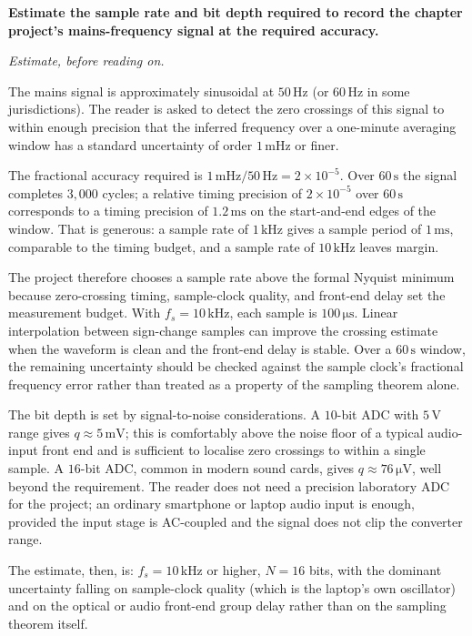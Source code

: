 \begin{estimation}
\textbf{Estimate the sample rate and bit depth required to record
the chapter project's mains-frequency signal at the required
accuracy.}

\smallskip
\textit{Estimate, before reading on.}

\smallskip
The mains signal is approximately sinusoidal at $50 \,\si{\hertz}$
(or $60 \,\si{\hertz}$ in some jurisdictions). The reader is asked
to detect the zero crossings of this signal to within enough
precision that the inferred frequency over a one-minute averaging
window has a standard uncertainty of order $1 \,\si{\milli\hertz}$
or finer.

The fractional accuracy required is $1 \,\si{\milli\hertz} / 50 \,\si
{\hertz} = 2 \times 10^{-5}$. Over $60 \,\si{\second}$ the signal
completes $3{,}000$ cycles; a relative timing precision of $2 \times
10^{-5}$ over $60 \,\si{\second}$ corresponds to a timing precision
of $1.2 \,\si{\milli\second}$ on the start-and-end edges of the
window. That is generous: a sample rate of $1 \,\si{\kilo\hertz}$
gives a sample period of $1 \,\si{\milli\second}$, comparable to the
timing budget, and a sample rate of $10 \,\si{\kilo\hertz}$ leaves
margin.

The project therefore chooses a sample rate above the formal
Nyquist minimum because zero-crossing timing, sample-clock quality,
and front-end delay set the measurement budget. With $f_{s} = 10
\,\si{\kilo\hertz}$, each sample is $100 \,\si{\micro\second}$.
Linear interpolation between sign-change samples can improve the
crossing estimate when the waveform is clean and the front-end
delay is stable. Over a $60 \,\si{\second}$ window, the remaining
uncertainty should be checked against the sample clock's fractional
frequency error rather than treated as a property of the sampling
theorem alone.

The bit depth is set by signal-to-noise considerations. A
$10$-bit ADC with $5 \,\si{\volt}$ range gives $q \approx 5 \,\si
{\milli\volt}$; this is comfortably above the noise floor of a
typical audio-input front end and is sufficient to localise zero
crossings to within a single sample. A $16$-bit ADC, common in
modern sound cards, gives $q \approx 76 \,\si{\micro\volt}$, well
beyond the requirement. The reader does not need a precision
laboratory ADC for the project; an ordinary smartphone or laptop
audio input is enough, provided the input stage is AC-coupled and
the signal does not clip the converter range.

The estimate, then, is: $f_{s} = 10 \,\si{\kilo\hertz}$ or higher,
$N = 16$ bits, with the dominant uncertainty falling on
sample-clock quality (which is the laptop's own oscillator) and on
the optical or audio front-end group delay rather than on the
sampling theorem itself.
\end{estimation}


